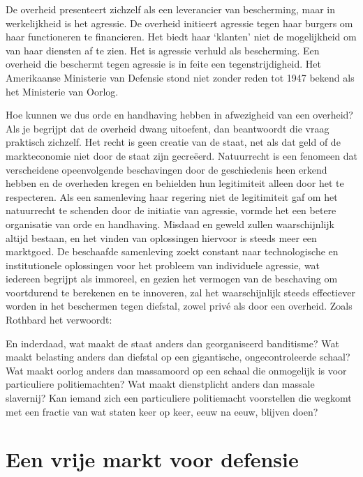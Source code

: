 De overheid presenteert zichzelf als een leverancier van bescherming, maar in werkelijkheid is het agressie. De overheid initieert agressie tegen haar burgers om haar functioneren te financieren. Het biedt haar `klanten' niet de mogelijkheid om van haar diensten af te zien. Het is agressie verhuld als bescherming. Een overheid die beschermt tegen agressie is in feite een tegenstrijdigheid. Het Amerikaanse Ministerie van Defensie stond niet zonder reden tot 1947 bekend als het Ministerie van Oorlog.

Hoe kunnen we dus orde en handhaving hebben in afwezigheid van een overheid? Als je begrijpt dat de overheid dwang uitoefent, dan beantwoordt die vraag praktisch zichzelf. Het recht is geen creatie van de staat, net als dat geld of de markteconomie niet door de staat zijn gecreëerd. Natuurrecht is een fenomeen dat verscheidene opeenvolgende beschavingen door de geschiedenis heen erkend hebben en de overheden kregen en behielden hun legitimiteit alleen door het te respecteren. Als een samenleving haar regering niet de legitimiteit gaf om het natuurrecht te schenden door de initiatie van agressie, vormde het een betere organisatie van orde en handhaving. Misdaad en geweld zullen waarschijnlijk altijd bestaan, en het vinden van oplossingen hiervoor is steeds meer een marktgoed. De beschaafde samenleving zoekt constant naar technologische en institutionele oplossingen voor het probleem van individuele agressie, wat iedereen begrijpt als immoreel, en gezien het vermogen van de beschaving om voortdurend te berekenen en te innoveren, zal het waarschijnlijk steeds effectiever worden in het beschermen tegen diefstal, zowel privé als door een overheid. Zoals Rothbard het verwoordt:

\begin{blockquotebox}
En inderdaad, wat maakt de staat anders dan georganiseerd banditisme? Wat maakt belasting anders dan diefstal op een gigantische, ongecontroleerde schaal? Wat maakt oorlog anders dan massamoord op een schaal die onmogelijk is voor particuliere politiemachten? Wat maakt dienstplicht anders dan massale slavernij? Kan iemand zich een particuliere politiemacht voorstellen die wegkomt met een fractie van wat staten keer op keer, eeuw na eeuw, blijven doen?\footnotemark
\end{blockquotebox}

\hypertarget{een-vrije-markt-voor-bescherming}{%
\section{Een vrije markt voor defensie}\label{een-vrije-markt-voor-bescherming}}

